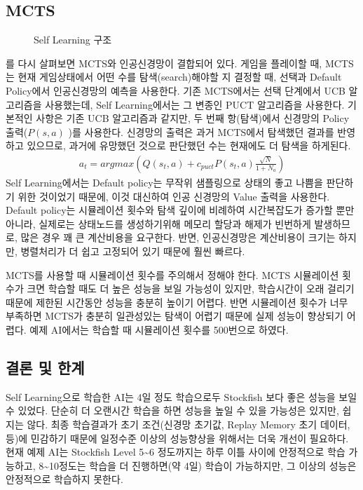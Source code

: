 \documentclass[letterpaper,10pt,english]{sphinxmanual}
\begin{document}
\subsection{MCTS}
\label{\detokenize{05-self_learning:mcts}}
\begin{figure}[htbp]
\centering
\capstart

\noindent{}
\caption{Self Learning 구조}\label{\detokenize{05-self_learning:self-learning-fig}}\label{\detokenize{05-self_learning:id12}}\end{figure}

{\hyperref[\detokenize{05-self_learning:self-learning-fig}]{}} 를 다시 살펴보면 MCTS와 인공신경망이 결합되어 있다.
게임을 플레이할 때, MCTS는 현재 게임상태에서 어떤 수를 탐색(search)해야할 지 결정할 때,
선택과 Default Policy에서 인공신경망의 예측을 사용한다.
기존 MCTS에서는 선택 단계에서 UCB 알고리즘을 사용했는데, Self Learning에서는 그 변종인 PUCT 알고리즘을 사용한다.
기본적인 사항은 기존 UCB 알고리즘과 같지만, 두 번째 항(탐색)에서 신경망의 Policy 출력(\(P(s, a)\) )를 사용한다.
신경망의 출력은 과거 MCTS에서 탐색했던 결과를 반영하고 있으므로,
과거에 유망했던 것으로 판단했던 수는 현재에도 더 탐색을 하게된다.
\begin{equation}\label{equation:05-self_learning:PUCT}
\begin{split}a_t = argmax(Q(s_t, a) + c_{puct} P(s_t, a) \frac{\sqrt{N}}{1 + N_a})\end{split}
\end{equation}
Self Learning에서는 Default policy는 무작위 샘플링으로 상태의 좋고 나쁨을 판단하기 위한 것이었기 때문에,
이것 대신하여 인공 신경망의 Value 출력을 사용한다.
Default policy는 시뮬레이션 횟수와 탐색 깊이에 비례하여 시간복잡도가 증가할 뿐만 아니라,
실제로는 상태노드를 생성하기위해 메모리 할당과 해제가 빈번하게 발생하므로, 많은 경우 꽤 큰 계산비용을 요구한다.
반면, 인공신경망은 계산비용이 크기는 하지만, 병렬처리가 더 쉽고 고정되어 있기 때문에 훨씬 빠르다.

MCTS를 사용할 때 시뮬레이션 횟수를 주의해서 정해야 한다.
MCTS 시뮬레이션 횟수가 크면 학습할 때도 더 높은 성능을 보일 가능성이 있지만, 학습시간이 오래 걸리기 때문에 제한된
시간동안 성능을 충분히 높이기 어렵다.
반면 시뮬레이션 횟수가 너무 부족하면 MCTS가 충분히 일관성있는 탐색이 어렵기 때문에 실제 성능이 향상되기 어렵다.
예제 AI에서는 학습할 때 시뮬레이션 횟수를 500번으로 하였다.


\subsection{결론 및 한계}
\label{\detokenize{05-self_learning:id5}}
Self Learning으로 학습한 AI는 4일 정도 학습으로두 Stockfish 보다 좋은 성능을 보일 수 있었다.
단순히 더 오랜시간 학습을 하면 성능을 높일 수 있을 가능성은 있지만, 쉽지는 않다.
최종 학습결과가 초기 조건(신경망 초기값, Replay Memory 초기 데이터, 등)에 민감하기 때문에 일정수준 이상의 성능향상을 위해서는 더욱 개선이 필요하다.
현재 예제 AI는 Stockfish Level 5\textasciitilde{}6 정도까지는 하루 이틀 사이에 안정적으로 학습 가능하고, 8\textasciitilde{}10정도는 학습을 더 진행하면(약 4일) 학습이 가능하지만,
그 이상의 성능은 안정적으로 학습하지 못한다.
\end{document}
